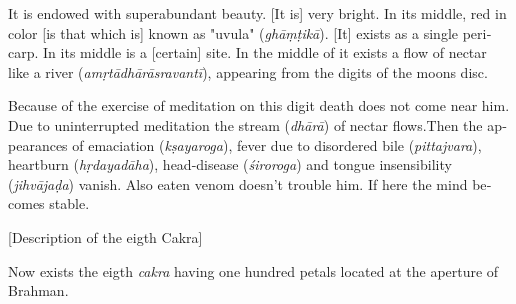 \begin{otherlanguage}{english}
\begin{tlate}
  It is endowed with superabundant beauty. [It is] very bright. In its middle, red in color [is that which is] known as "uvula" (\textit{ghāṃṭikā}). [It] exists as a single pericarp. In its middle is a [certain] site. In the middle of it exists a flow of nectar like a river (\textit{amṛtādhārāsravantī}), appearing from the digits of the moons disc.
    \end{tlate}
  \begin{tlate} 
Because of the exercise of meditation on this digit death does not come near him. Due to uninterrupted meditation the stream (\textit{dhārā}) of nectar flows.Then the appearances of emaciation (\textit{kṣayaroga}), fever due to disordered bile (\textit{pittajvara}), heartburn (\textit{hṛdayadāha}), head-disease (\textit{śiroroga}) and tongue insensibility (\textit{jihvājaḍa}) vanish. Also eaten venom doesn't trouble him. If here the mind becomes stable.     
  \end{tlate}
    \bigskip
    \centerline{\textrm{\small{[Description of the eigth Cakra]}}}
    \bigskip
          \begin{tlate}
Now exists the eigth \textit{cakra} having one hundred petals located at the aperture of Brahman.
          \end{tlate}
    \begin{tlate}
\end{tlate}
    \begin{tlate}

\end{tlate}
\end{otherlanguage}
